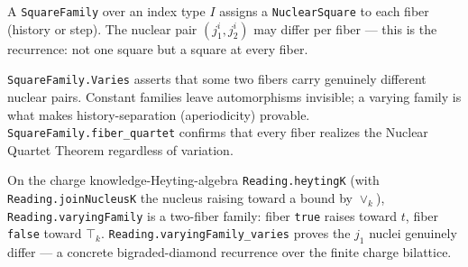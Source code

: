 \begin{proposition}\label{thm:square-family}\leanok{}
A \texttt{SquareFamily} over an index type $I$ assigns a \texttt{NuclearSquare} to each fiber (history or step). The nuclear pair $(j_1^i, j_2^i)$ may differ per fiber --- this is the recurrence: not one square but a square at every fiber.
\end{proposition}
\begin{proposition}\label{thm:varies}\leanok{}
\texttt{SquareFamily.Varies} asserts that some two fibers carry genuinely different nuclear pairs. Constant families leave automorphisms invisible; a varying family is what makes history-separation (aperiodicity) provable. \texttt{SquareFamily.fiber\_quartet} confirms that every fiber realizes the Nuclear Quartet Theorem regardless of variation.
\end{proposition}
\begin{example}\label{ex:varying-family}\leanok{}
On the charge knowledge-Heyting-algebra \texttt{Reading.heytingK} (with \texttt{Reading.joinNucleusK} the nucleus raising toward a bound by $\vee_k$), \texttt{Reading.varyingFamily} is a two-fiber family: fiber \texttt{true} raises toward $t$, fiber \texttt{false} toward $\top_k$. \texttt{Reading.varyingFamily\_varies} proves the $j_1$ nuclei genuinely differ --- a concrete bigraded-diamond recurrence over the finite charge bilattice.
\end{example}
